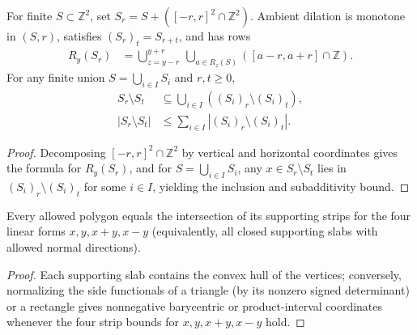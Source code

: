 \begin{lemma}
    \label{thm:area_law_dilation_rows_union}
    \leanok
    For finite $S\subset\mathbb Z^2$, set $S_r=S+([-r,r]^2\cap\mathbb Z^2)$. Ambient dilation is monotone in $(S,r)$, satisfies $(S_r)_t=S_{r+t}$, and has rows
    \begin{align}
        R_y(S_r) & =
        \bigcup_{z=y-r}^{y+r}\ \bigcup_{a\in R_z(S)}
        ([a-r,a+r]\cap\mathbb Z).
    \end{align}
    For any finite union $S=\bigcup_{i\in I}S_i$ and $r,t\ge0$,
    \begin{align}
        S_r\setminus S_t   & \subseteq\bigcup_{i\in I}((S_i)_r\setminus(S_i)_t), \\
        |S_r\setminus S_t| & \le\sum_{i\in I}|(S_i)_r\setminus(S_i)_t|.
    \end{align}
\end{lemma}
\begin{proof}
    \leanok
    Decomposing $[-r,r]^2\cap\mathbb Z^2$ by vertical and horizontal coordinates gives the formula for $R_y(S_r)$, and for $S=\bigcup_{i\in I}S_i$, any $x\in S_r\setminus S_t$ lies in $(S_i)_r\setminus(S_i)_t$ for some $i\in I$, yielding the inclusion and subadditivity bound.
\end{proof}

\begin{lemma}
    \label{thm:area_law_polygon_strips}
    \leanok
    Every allowed polygon equals the intersection of its supporting strips for the four linear forms $x,y,x+y,x-y$ (equivalently, all closed supporting slabs with allowed normal directions).
\end{lemma}
\begin{proof}
    \leanok
    Each supporting slab contains the convex hull of the vertices; conversely, normalizing the side functionals of a triangle (by its nonzero signed determinant) or a rectangle gives nonnegative barycentric or product-interval coordinates whenever the four strip bounds for $x,y,x+y,x-y$ hold.
\end{proof}

